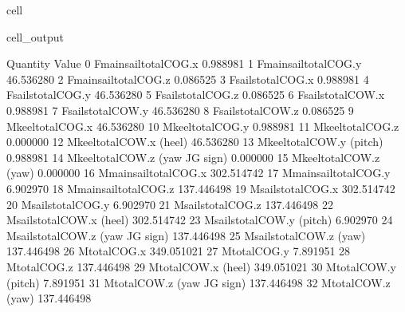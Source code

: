 \documentclass[a4paper,12pt,english]{jupyterBook}
\begin{document}
\begin{sphinxuseclass}{cell}
\begin{sphinxVerbatimOutput}
\begin{sphinxuseclass}{cell_output}
\begin{sphinxVerbatim}[commandchars=\\\{\}]
                               Quantity       Value
0               F\PYGZus{}main\PYGZus{}sail\PYGZus{}total\PYGZus{}COG.x    0.988981
1               F\PYGZus{}main\PYGZus{}sail\PYGZus{}total\PYGZus{}COG.y   46.536280
2               F\PYGZus{}main\PYGZus{}sail\PYGZus{}total\PYGZus{}COG.z   \PYGZhy{}0.086525
3                   F\PYGZus{}sails\PYGZus{}total\PYGZus{}COG.x    0.988981
4                   F\PYGZus{}sails\PYGZus{}total\PYGZus{}COG.y   46.536280
5                   F\PYGZus{}sails\PYGZus{}total\PYGZus{}COG.z   \PYGZhy{}0.086525
6                   F\PYGZus{}sails\PYGZus{}total\PYGZus{}COW.x    0.988981
7                   F\PYGZus{}sails\PYGZus{}total\PYGZus{}COW.y   46.536280
8                   F\PYGZus{}sails\PYGZus{}total\PYGZus{}COW.z   \PYGZhy{}0.086525
9                    M\PYGZus{}keel\PYGZus{}total\PYGZus{}COG.x  \PYGZhy{}46.536280
10                   M\PYGZus{}keel\PYGZus{}total\PYGZus{}COG.y    0.988981
11                   M\PYGZus{}keel\PYGZus{}total\PYGZus{}COG.z    0.000000
12            M\PYGZus{}keel\PYGZus{}total\PYGZus{}COW.x (heel)  \PYGZhy{}46.536280
13           M\PYGZus{}keel\PYGZus{}total\PYGZus{}COW.y (pitch)    0.988981
14   M\PYGZus{}keel\PYGZus{}total\PYGZus{}COW.z (yaw \PYGZhy{} JG sign)   \PYGZhy{}0.000000
15             M\PYGZus{}keel\PYGZus{}total\PYGZus{}COW.z (yaw)    0.000000
16              M\PYGZus{}main\PYGZus{}sail\PYGZus{}total\PYGZus{}COG.x \PYGZhy{}302.514742
17              M\PYGZus{}main\PYGZus{}sail\PYGZus{}total\PYGZus{}COG.y    6.902970
18              M\PYGZus{}main\PYGZus{}sail\PYGZus{}total\PYGZus{}COG.z  137.446498
19                  M\PYGZus{}sails\PYGZus{}total\PYGZus{}COG.x \PYGZhy{}302.514742
20                  M\PYGZus{}sails\PYGZus{}total\PYGZus{}COG.y    6.902970
21                  M\PYGZus{}sails\PYGZus{}total\PYGZus{}COG.z  137.446498
22           M\PYGZus{}sails\PYGZus{}total\PYGZus{}COW.x (heel) \PYGZhy{}302.514742
23          M\PYGZus{}sails\PYGZus{}total\PYGZus{}COW.y (pitch)    6.902970
24  M\PYGZus{}sails\PYGZus{}total\PYGZus{}COW.z (yaw \PYGZhy{} JG sign) \PYGZhy{}137.446498
25            M\PYGZus{}sails\PYGZus{}total\PYGZus{}COW.z (yaw)  137.446498
26                        M\PYGZus{}total\PYGZus{}COG.x \PYGZhy{}349.051021
27                        M\PYGZus{}total\PYGZus{}COG.y    7.891951
28                        M\PYGZus{}total\PYGZus{}COG.z  137.446498
29                 M\PYGZus{}total\PYGZus{}COW.x (heel) \PYGZhy{}349.051021
30                M\PYGZus{}total\PYGZus{}COW.y (pitch)    7.891951
31        M\PYGZus{}total\PYGZus{}COW.z (yaw \PYGZhy{} JG sign) \PYGZhy{}137.446498
32                  M\PYGZus{}total\PYGZus{}COW.z (yaw)  137.446498
\end{sphinxVerbatim}

\end{sphinxuseclass}\end{sphinxVerbatimOutput}

\end{sphinxuseclass}
\end{document}

